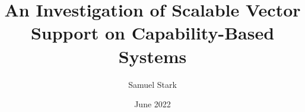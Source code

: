
\title{An Investigation of Scalable Vector Support on Capability-Based Systems}

\author{Samuel Stark}





\date{June 2022}

